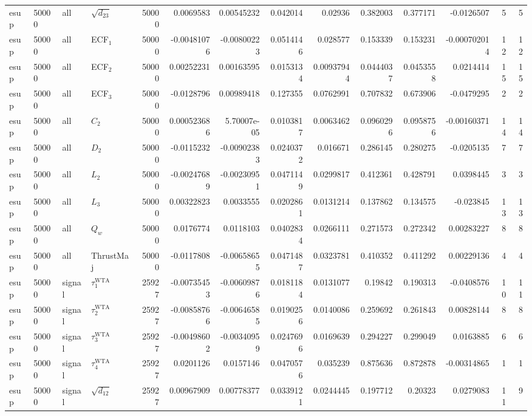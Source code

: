 \begin{landscape}
\begin{longtable}{llll r rrrr rr r rr}
esup & 50000 & all & $\sqrt{d_{23}}$ & 50000 & 0.0069583 & 0.00545232 & 0.042014 & 0.02936 & 0.382003 & 0.377171 & -0.0126507 & 5 & 5 \\
esup & 50000 & all & ECF$_1$ & 50000 & -0.00481076 & -0.00800223 & 0.0514146 & 0.028577 & 0.153339 & 0.153231 & -0.000702014 & 12 & 12 \\
esup & 50000 & all & ECF$_2$ & 50000 & 0.00252231 & 0.00163595 & 0.0153134 & 0.00937944 & 0.0444037 & 0.0453558 & 0.0214414 & 15 & 15 \\
esup & 50000 & all & ECF$_3$ & 50000 & -0.0128796 & 0.00989418 & 0.127355 & 0.0762991 & 0.707832 & 0.673906 & -0.0479295 & 2 & 2 \\
esup & 50000 & all & $C_2$ & 50000 & 0.000523686 & 5.70007e-05 & 0.0103817 & 0.0063462 & 0.0960296 & 0.0958756 & -0.00160371 & 14 & 14 \\
esup & 50000 & all & $D_2$ & 50000 & -0.0115232 & -0.00902383 & 0.0240372 & 0.016671 & 0.286145 & 0.280275 & -0.0205135 & 7 & 7 \\
esup & 50000 & all & $L_2$ & 50000 & -0.00247689 & -0.00230951 & 0.0471149 & 0.0299817 & 0.412361 & 0.428791 & 0.0398445 & 3 & 3 \\
esup & 50000 & all & $L_3$ & 50000 & 0.00322823 & 0.0033555 & 0.0202861 & 0.0131214 & 0.137862 & 0.134575 & -0.023845 & 13 & 13 \\
esup & 50000 & all & $Q_w$ & 50000 & 0.0176774 & 0.0118103 & 0.0402834 & 0.0266111 & 0.271573 & 0.272342 & 0.00283227 & 8 & 8 \\
esup & 50000 & all & ThrustMaj & 50000 & -0.0117808 & -0.00658655 & 0.0471487 & 0.0323781 & 0.410352 & 0.411292 & 0.00229136 & 4 & 4 \\
esup & 50000 & signal & $\tau_1^{\mathrm{WTA}}$ & 25927 & -0.00735453 & -0.00609876 & 0.0181184 & 0.0131077 & 0.19842 & 0.190313 & -0.0408576 & 10 & 11 \\
esup & 50000 & signal & $\tau_2^{\mathrm{WTA}}$ & 25927 & -0.00858766 & -0.00646585 & 0.0190256 & 0.0140086 & 0.259692 & 0.261843 & 0.00828144 & 8 & 8 \\
esup & 50000 & signal & $\tau_3^{\mathrm{WTA}}$ & 25927 & -0.00498602 & -0.00340959 & 0.0247696 & 0.0169639 & 0.294227 & 0.299049 & 0.0163885 & 6 & 6 \\
esup & 50000 & signal & $\tau_4^{\mathrm{WTA}}$ & 25927 & 0.0201126 & 0.0157146 & 0.0470576 & 0.035239 & 0.875636 & 0.872878 & -0.00314865 & 1 & 1 \\
esup & 50000 & signal & $\sqrt{d_{12}}$ & 25927 & 0.00967909 & 0.00778377 & 0.0339121 & 0.0244445 & 0.197712 & 0.20323 & 0.0279083 & 11 & 9 \\

\end{longtable}
\end{landscape}
